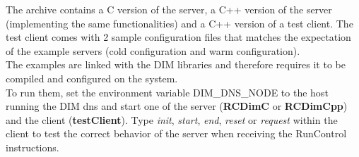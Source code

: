 \documentclass[a4paper]{article}
\begin{document}
The archive contains a C version of the server, a C++ version of the server (implementing the same
functionalities) and a C++ version of a test client.
The test client comes with 2 sample configuration files that matches the expectation of the
example servers (cold configuration and warm configuration).\\
The examples are linked with the DIM libraries and therefore requires it to be compiled and
configured on the system.\\
To run them, set the environment variable DIM\_DNS\_NODE to the host running the DIM dns and start
one of the server (\textbf{RCDimC} or \textbf{RCDimCpp}) and the client (\textbf{testClient}). Type
\textit{init}, \textit{start}, \textit{end}, \textit{reset} or \textit{request} within the client to test the
correct behavior of the server when receiving the RunControl instructions.

\thebibliography{}

\end{document}
